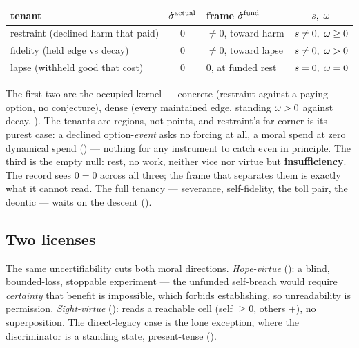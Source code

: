 \documentclass[../main]{subfiles}
\begin{document}
\begin{table}[htbp]
  \centering
  \begin{tabularx}{\textwidth}{@{} l c L c @{}}
    \toprule
    \textbf{tenant} & $\dot{\sigma}\sp{\mathrm{actual}}$ & \textbf{frame $\dot{\sigma}\sp{\mathrm{fund}}$}
      & $s,\ \omega$ \\
    \midrule
     restraint (declined harm that paid) & $0$ & $\neq0$, toward harm
      & $\moralvel\neq0,\ \will\ge0$ \\
    \addlinespace
     fidelity (held edge vs decay) & $0$ & $\neq0$, toward lapse
      & $\moralvel\neq0,\ \will>0$ \\
    \addlinespace
     lapse (withheld good that cost) & $0$ & $0$, at funded rest
      & $\moralvel=0,\ \will=0$ \\
    \bottomrule
  \end{tabularx}
\end{table}

\noindent The first two are the occupied kernel ---  concrete (restraint
against a paying option, no conjecture),  dense (every maintained edge,
standing $\omega>0$ against decay, ). The tenants are regions, not points,
and restraint's far corner is its purest case: a declined option-\emph{event} asks no
forcing at all, a moral spend at zero dynamical spend
() --- nothing for any instrument to catch even in principle.
The third is the empty null: rest, no work, neither vice nor
virtue but \textbf{insufficiency}. The record sees $0=0$ across all three; the frame
that separates them is exactly what it cannot read. The full tenancy --- severance,
self-fidelity, the toll pair, the deontic --- waits on the descent
().

\subsection{Two licenses}
\label{subsec:good:licenses}
%
The same uncertifiability cuts both moral directions. \emph{Hope-virtue} (): a
blind, bounded-loss, stoppable experiment --- the unfunded self-breach would require
\emph{certainty} that benefit is impossible, which  forbids establishing, so
unreadability is permission. \emph{Sight-virtue} (): reads a reachable cell
(self $\ge0$, others $+$), no superposition. The direct-legacy case is the lone exception,
where the discriminator is a standing state, present-tense ().
\end{document}
